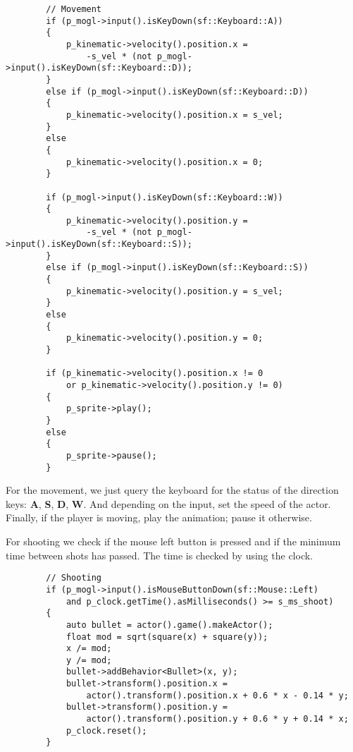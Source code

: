 \begin{lstlisting}
        // Movement
        if (p_mogl->input().isKeyDown(sf::Keyboard::A))
        {
            p_kinematic->velocity().position.x =
                -s_vel * (not p_mogl->input().isKeyDown(sf::Keyboard::D));
        }
        else if (p_mogl->input().isKeyDown(sf::Keyboard::D))
        {
            p_kinematic->velocity().position.x = s_vel;
        }
        else
        {
            p_kinematic->velocity().position.x = 0;
        }

        if (p_mogl->input().isKeyDown(sf::Keyboard::W))
        {
            p_kinematic->velocity().position.y =
                -s_vel * (not p_mogl->input().isKeyDown(sf::Keyboard::S));
        }
        else if (p_mogl->input().isKeyDown(sf::Keyboard::S))
        {
            p_kinematic->velocity().position.y = s_vel;
        }
        else
        {
            p_kinematic->velocity().position.y = 0;
        }

        if (p_kinematic->velocity().position.x != 0
            or p_kinematic->velocity().position.y != 0)
        {
            p_sprite->play();
        }
        else
        {
            p_sprite->pause();
        }
\end{lstlisting}

For the movement, we just query the keyboard for the status of the direction keys: 
\textbf{A}, \textbf{S}, \textbf{D}, \textbf{W}.  And depending on the input, set the 
speed of the actor. Finally, if the player is moving, play the animation; pause it 
otherwise.

For shooting we check if the mouse left button is pressed and if the minimum time between shots 
has passed. The time is checked by using the clock.

\begin{lstlisting}
        // Shooting
        if (p_mogl->input().isMouseButtonDown(sf::Mouse::Left)
            and p_clock.getTime().asMilliseconds() >= s_ms_shoot)
        {
            auto bullet = actor().game().makeActor();
            float mod = sqrt(square(x) + square(y));
            x /= mod;
            y /= mod;
            bullet->addBehavior<Bullet>(x, y);
            bullet->transform().position.x =
                actor().transform().position.x + 0.6 * x - 0.14 * y;
            bullet->transform().position.y =
                actor().transform().position.y + 0.6 * y + 0.14 * x;
            p_clock.reset();
        }
\end{lstlisting}

